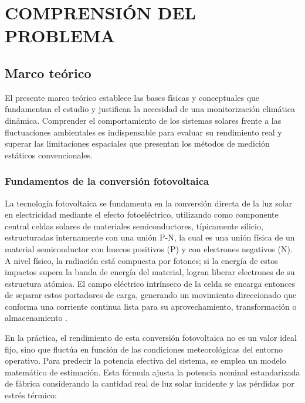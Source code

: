 \onehalfspacing
{}

\chapter{COMPRENSIÓN DEL PROBLEMA}

\section{Marco teórico}

El presente marco teórico establece las bases físicas y conceptuales que fundamentan el estudio y justifican la necesidad de una monitorización climática dinámica. Comprender el comportamiento de los sistemas solares frente a las fluctuaciones ambientales es indispensable para evaluar su rendimiento real y superar las limitaciones espaciales que presentan los métodos de medición estáticos convencionales.

\subsection{Fundamentos de la conversión fotovoltaica}
La tecnología fotovoltaica se fundamenta en la conversión directa de la luz solar en electricidad mediante el efecto fotoeléctrico, utilizando como componente central celdas solares de materiales semiconductores, típicamente silicio, estructuradas internamente con una unión P-N, la cual es una unión física de un material semiconductor con huecos positivos (P) y con electrones negativos (N). A nivel físico, la radiación está compuesta por fotones; si la energía de estos impactos supera la banda de energía del material, logran liberar electrones de su estructura atómica. El campo eléctrico intrínseco de la celda se encarga entonces de separar estos portadores de carga, generando un movimiento direccionado que conforma una corriente continua lista para su aprovechamiento, transformación o almacenamiento \citep{martinez2018estimation}.

En la práctica, el rendimiento de esta conversión fotovoltaica no es un valor ideal fijo, sino que fluctúa en función de las condiciones meteorológicas del entorno operativo. Para predecir la potencia efectiva del sistema, se emplea un modelo matemático de estimación. Esta fórmula ajusta la potencia nominal estandarizada de fábrica considerando la cantidad real de luz solar incidente y las pérdidas por estrés térmico:

